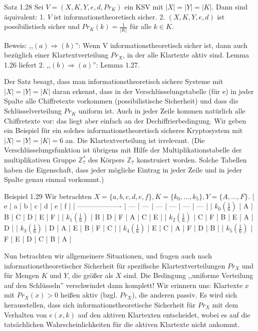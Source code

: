 \documentclass[a4paper]{article}
\begin{document}
\begin{multicols}{3}
    Satz 1.28 Sei $V= (X,K,Y,e,d,Pr_K)$ ein KSV mit $|X|=|Y|=|K|$. Dann sind äquivalent:
    1. $V$ ist informationstheoretisch sicher.
    2. $(X,K,Y,e,d)$ ist possibilistisch sicher und $Pr_K(k)=\frac{1}{|K|}$ für alle $k\in K$.

    Beweis:  ,,$(a)\Rightarrow (b)$'': Wenn V informationstheoretisch sicher ist, dann auch bezüglich einer Klartextverteilung $Pr_X$, in der alle Klartexte aktiv sind. Lemma 1.26 liefert 2. ,,$(b)\Rightarrow (a)$'': Lemma 1.27.

    Der Satz besagt, dass man informationstheoretisch sichere Systeme mit $|X|=|Y|=|K|$ daran erkennt, dass in der Verschlüsselungstabelle (für e) in jeder Spalte alle Chiffretexte vorkommen (possibilistische Sicherheit) und dass die Schlüsselverteilung $Pr_K$ uniform ist. Auch in jeder Zeile kommen natürlich alle Chiffretexte vor: das liegt aber einfach an der Dechiffrierbedingung.
    Wir geben ein Beispiel für ein solches informationstheoretisch sicheres Kryptosystem mit $|X|=|Y|=|K|=6$ an. Die Klartextverteilung ist irrelevant. (Die Verschlüsselungsfunktion ist übrigens mit Hilfe der Multiplikationstabelle der multiplikativen Gruppe $\mathbb{Z}^*_7$ des Körpers $\mathbb{Z}_7$ konstruiert worden. Solche Tabellen haben die Eigenschaft, dass jeder mögliche Eintrag in jeder Zeile und in jeder Spalte genau einmal vorkommt.)

    Beispiel 1.29 Wir betrachten $X=\{a,b,c,d,e,f\},K=\{k_0 ,...,k_5\},Y=\{A,...,F\}$.
    | e                   | a   | b   | c   | d   | e   | f   |
    | ------------------- | --- | --- | --- | --- | --- | --- |
    | $k_0 (\frac{1}{6})$ | A   | B   | C   | D   | E   | F   |
    | $k_1 (\frac{1}{6})$ | B   | D   | F   | A   | C   | E   |
    | $k_2 (\frac{1}{6})$ | C   | F   | B   | E   | A   | D   |
    | $k_3 (\frac{1}{6})$ | D   | A   | E   | B   | F   | C   |
    | $k_4 (\frac{1}{6})$ | E   | C   | A   | F   | D   | B   |
    | $k_5 (\frac{1}{6})$ | F   | E   | D   | C   | B   | A   |

    Nun betrachten wir allgemeinere Situationen, und fragen auch nach informationstheoretischer Sicherheit für spezifische Klartextverteilungen $Pr_X$ und für Mengen $K$ und $Y$, die größer als $X$ sind. Die Bedingung ,,uniforme Verteilung auf den Schlüsseln'' verschwindet dann komplett! Wir erinnern uns: Klartexte $x$ mit $Pr_X(x)> 0$ heißen aktiv (bzgl. $Pr_X$), die anderen passiv. Es wird sich herausstellen, dass sich informationstheoretische Sicherheit für $Pr_X$ mit dem Verhalten von $e(x,k)$ auf den aktiven Klartexten entscheidet, wobei es auf die tatsächlichen Wahrscheinlichkeiten für die aktiven Klartexte nicht ankommt.


\end{multicols}
\end{document}
